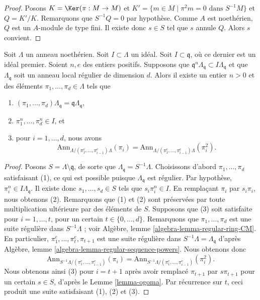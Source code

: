 \begin{proof}
Posons $K = \Ker(\pi : M \to M)$ et
$K' = \{m \in M \mid \pi^2 m = 0\text{ dans }S^{-1}M\}$ et
$Q = K'/K$. Remarquons que $S^{-1}Q = 0$ par hypothèse. Comme $A$
est noethérien, $Q$ est un $A$-module de type fini.
Il existe donc $s \in S$ tel que $s$ annule $Q$.
Alors $s$ convient.
\end{proof}

\begin{lemma}
\label{lemma-find-sequence}
Soit $\Lambda$ un anneau noethérien. Soit $I \subset \Lambda$ un idéal.
Soit $I \subset \mathfrak q$, où ce dernier est un idéal premier. Soient $n, e$ des entiers positifs.
Supposons que $\mathfrak q^n\Lambda_\mathfrak q \subset I\Lambda_\mathfrak q$
et que $\Lambda_\mathfrak q$ soit un anneau local régulier de dimension $d$.
Alors il existe un entier $n > 0$ et des éléments $\pi_1, \ldots, \pi_d \in \Lambda$ tels que
\begin{enumerate}
\item $(\pi_1, \ldots, \pi_d)\Lambda_\mathfrak q =
\mathfrak q\Lambda_\mathfrak q$,
\item $\pi_1^n, \ldots, \pi_d^n \in I$, et
\item pour $i = 1, \ldots, d$, nous avons
$$
\text{Ann}_{\Lambda/(\pi_1^e, \ldots, \pi_{i - 1}^e)\Lambda}(\pi_i) =
\text{Ann}_{\Lambda/(\pi_1^e, \ldots, \pi_{i - 1}^e)\Lambda}(\pi_i^2).
$$
\end{enumerate}
\end{lemma}

\begin{proof}
Posons $S = \Lambda \setminus \mathfrak q$, de sorte que
$\Lambda_\mathfrak q = S^{-1}\Lambda$.
Choisissons d'abord $\pi_1, \ldots, \pi_d$ satisfaisant (1), ce qui est possible
puisque $\Lambda_\mathfrak q$ est régulier. Par hypothèse,
$\pi_i^n \in I\Lambda_\mathfrak q$. Il existe donc
$s_1, \ldots, s_d \in S$ tels que $s_i\pi_i^n \in I$.
En remplaçant $\pi_i$ par $s_i\pi_i$, nous obtenons (2).
Remarquons que (1) et (2) sont préservées par toute multiplication ultérieure par des éléments de $S$.
Supposons que (3) soit satisfaite pour $i = 1, \ldots, t$, pour un certain
$t \in \{0, \ldots, d\}$. Remarquons que
$\pi_1, \ldots, \pi_d$ est une suite régulière dans $S^{-1}\Lambda$ ; voir
Algèbre, lemme \ref{algebra-lemma-regular-ring-CM}.
En particulier, $\pi_1^e, \ldots, \pi_t^e, \pi_{t + 1}$ est une
suite régulière dans $S^{-1}\Lambda = \Lambda_\mathfrak q$ d'après
Algèbre, lemme \ref{algebra-lemma-regular-sequence-powers}.
Nous obtenons donc
$$
\text{Ann}_{S^{-1}\Lambda/(\pi_1^e, \ldots, \pi_{i - 1}^e)}(\pi_i) =
\text{Ann}_{S^{-1}\Lambda/(\pi_1^e, \ldots, \pi_{i - 1}^e)}(\pi_i^2).
$$
Nous obtenons ainsi (3) pour $i = t + 1$ après avoir remplacé $\pi_{t + 1}$ par $s\pi_{t + 1}$
pour un certain $s \in S$, d'après le Lemme \ref{lemma-ogoma}. Par récurrence sur $t$, ceci
produit une suite satisfaisant (1), (2) et (3).
\end{proof}

